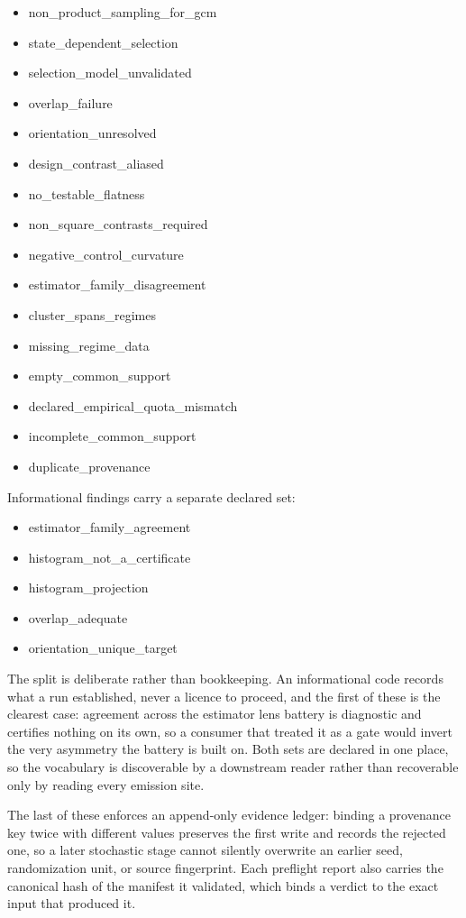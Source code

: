 \documentclass[11pt]{article}
\begin{document}
\begin{itemize}[nosep, leftmargin=1.5em, font=\ttfamily]
  \item non\_product\_sampling\_for\_gcm
  \item state\_dependent\_selection
  \item selection\_model\_unvalidated
  \item overlap\_failure
  \item orientation\_unresolved
  \item design\_contrast\_aliased
  \item no\_testable\_flatness
  \item non\_square\_contrasts\_required
  \item negative\_control\_curvature
  \item estimator\_family\_disagreement
  \item cluster\_spans\_regimes
  \item missing\_regime\_data
  \item empty\_common\_support
  \item declared\_empirical\_quota\_mismatch
  \item incomplete\_common\_support
  \item duplicate\_provenance
\end{itemize}

Informational findings carry a separate declared set:

\begin{itemize}[nosep, leftmargin=1.5em, font=\ttfamily]
  \item estimator\_family\_agreement
  \item histogram\_not\_a\_certificate
  \item histogram\_projection
  \item overlap\_adequate
  \item orientation\_unique\_target
\end{itemize}  The split is deliberate rather than
bookkeeping.  An informational code records what a run established, never a
licence to proceed, and the first of these is the clearest case: agreement
across the estimator lens battery is diagnostic and certifies nothing on its
own, so a consumer that treated it as a gate would invert the very asymmetry
the battery is built on.  Both sets are declared in one place, so the
vocabulary is discoverable by a downstream reader rather than recoverable only
by reading every emission site.

The last of these enforces an append-only evidence ledger: binding a provenance
key twice with different values preserves the first write and records the
rejected one, so a later stochastic stage cannot silently overwrite an earlier
seed, randomization unit, or source fingerprint. Each preflight report also
carries the canonical hash of the manifest it validated, which binds a verdict
to the exact input that produced it.
\end{document}
